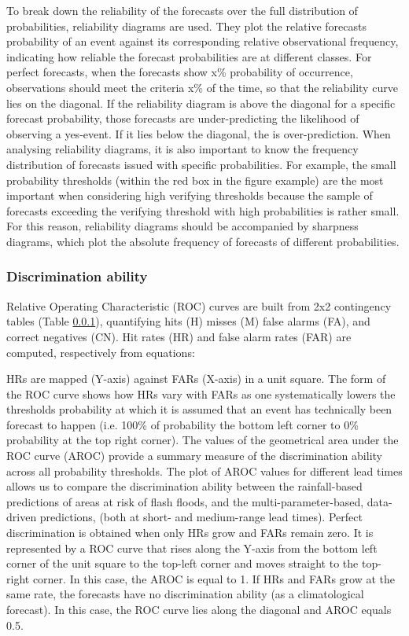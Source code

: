 To break down the reliability of the forecasts over the full distribution of probabilities, reliability diagrams are used. They plot the relative forecasts probability of an event against its corresponding relative observational frequency, indicating how reliable the forecast probabilities are at different classes. For perfect forecasts, when the forecasts show x\% probability of occurrence, observations should meet the criteria x\% of the time, so that the reliability curve lies on the diagonal. If the reliability diagram is above the diagonal for a specific forecast probability, those forecasts are under-predicting the likelihood of observing a yes-event. If it lies below the diagonal, the is over-prediction. When analysing reliability diagrams, it is also important to know the frequency distribution of forecasts issued with specific probabilities. For example, the small probability thresholds (within the red box in the figure example) are the most important when considering high verifying thresholds because the sample of forecasts exceeding the verifying threshold with high probabilities is rather small. For this reason, reliability diagrams should be accompanied by sharpness diagrams, which plot the absolute frequency of forecasts of different probabilities. 


\subsubsection{Discrimination ability}

Relative Operating Characteristic (ROC) curves are built from 2x2 contingency tables (Table \ref{}), quantifying hits (H) misses (M) false alarms (FA), and correct negatives (CN). Hit rates (HR) and false alarm rates (FAR) are computed, respectively from equations:




HRs are mapped (Y-axis) against FARs (X-axis) in a unit square. The form of the ROC curve shows how HRs vary with FARs as one systematically lowers the thresholds probability at which it is assumed that an event has technically been forecast to happen (i.e. 100\% of probability the bottom left corner to 0\% probability at the top right corner). The values of the geometrical area under the ROC curve (AROC) provide a summary measure of the discrimination ability across all probability thresholds. The plot of AROC values for different lead times allows us to compare the discrimination ability between the rainfall-based predictions of areas at risk of flash floods, and the multi-parameter-based, data-driven predictions, (both at short- and medium-range lead times). Perfect discrimination is obtained when only HRs grow and FARs remain zero. It is represented by a ROC curve that rises along the Y-axis from the bottom left corner of the unit square to the top-left corner and moves straight to the top-right corner. In this case, the AROC is equal to 1. If HRs and FARs grow at the same rate, the forecasts have no discrimination ability (as a climatological forecast). In this case, the ROC curve lies along the diagonal and AROC equals 0.5. 

